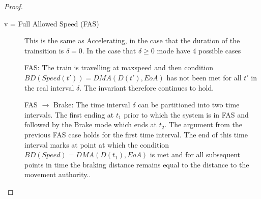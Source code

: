 \begin{mytheorem}
\begin{proof}
\begin{description}
\item[v = Full Allowed Speed (FAS)]
This is the same as  Accelerating, in the case that the duration of the trainsition is $\delta = 0 $. In the case that $\delta \geq 0$ mode have 4 possible cases 

FAS: The train is travelling at maxspeed and then condition $BD(Speed(t')) = DMA(D(t'), EoA)$ has not been met for all $t'$ in the real interval $\delta$. The invariant therefore continues to hold.

FAS $\to$ Brake: The time interval $\delta$ can be partitioned into two time intervals. The first ending at $t_1$ prior to which the system is in FAS and followed by the Brake mode which ends at $t_2$. The argument from the previous FAS case holds for the first time interval. The end of this time interval marks at point at which the condition $BD(Speed) = DMA(D(t_1), EoA)$ is met and for all subsequent points in time  the braking distance remains equal to the distance to the movement authority.. \\

\begin{comment}
FAS $\to$ Brake $\to$ Acc: The time interval $\delta$ can be partitioned into 3 time intervals. The first interval in which the system is in FAS ends at $t_1$, period in the Brake mode ends at $t_2$ and finally there is a period in the Acc Mode which ends at $t_3$. The argument for the time interval up to $t_2$ is the same as the argument for the previous FAS $\to$ Brake case. A new movement authority $EoA'$ is granted such that $ DMA(D(t_2), EoA) + 50 =  DMA(D(t_2), EoA')$ causing the jump from Brake to  Acc.  For the whole of the  time period spent in the Acc mode the invariant $D(t_3) < BD(EoA',Speed)$ holds as previously $BD(Speed) = DMA(DT(t_1), EoA)$ and it is impossible for the train to cover a distance of fifty in one time unit.


FAS $\to$ Brake $\to$ Acc $\to$ $FAS$: This follows the same argument as the previous however the time period has been partitioned into four instead of three. The invariant holds in the final FAS state for the same reason as the preceding Acc state as the control mode jump does not have any effect on the distance of the train.
\end{comment}

\begin{comment}
wo cases  $D(t) = BD(Speed, t)$ with $t = t_1$ or $t_2$,  $t_1 < t_2$. In the first case a jump occurs instantaneously to the $Braking$ mode with $D(t_1) = BD(Speed, t_1) < EoA$ In the second case time elapses to a point in the future $t_2$ and $D(t)$ increases until $D(t_2) = BD(Speed, t_2)$  then the system will perform a jump to the $Braking$ mode with $D(t_2) = BD(Speed, t_2)  < EoA$. 
\end{comment}


\end{description}
\end{proof}
\end{mytheorem}
